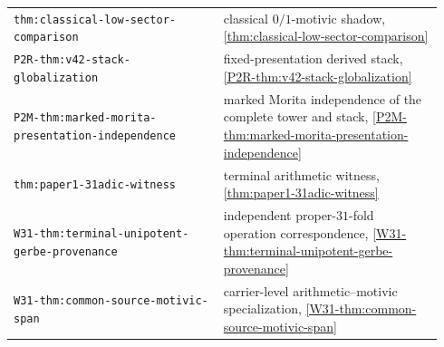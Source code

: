 \documentclass[11pt]{article}
\theoremstyle{remark}
\begin{document}
\begin{longtable}{@{}p{0.46\linewidth}p{0.48\linewidth}@{}}
\nolinkurl{thm:classical-low-sector-comparison}
  & classical \(0/1\)-motivic shadow, \cref{thm:classical-low-sector-comparison}\\
\nolinkurl{P2R-thm:v42-stack-globalization}
  & fixed-presentation derived stack, \cref{P2R-thm:v42-stack-globalization}\\
\nolinkurl{P2M-thm:marked-morita-presentation-independence}
  & marked Morita independence of the complete tower and stack,
    \cref{P2M-thm:marked-morita-presentation-independence}\\
\nolinkurl{thm:paper1-31adic-witness}
  & terminal arithmetic witness, \cref{thm:paper1-31adic-witness}\\
\nolinkurl{W31-thm:terminal-unipotent-gerbe-provenance}
  & independent proper-\(31\)-fold operation correspondence,
    \cref{W31-thm:terminal-unipotent-gerbe-provenance}\\
\nolinkurl{W31-thm:common-source-motivic-span}
  & carrier-level arithmetic--motivic specialization,
    \cref{W31-thm:common-source-motivic-span}\\
\bottomrule
\end{longtable}
\end{document}
